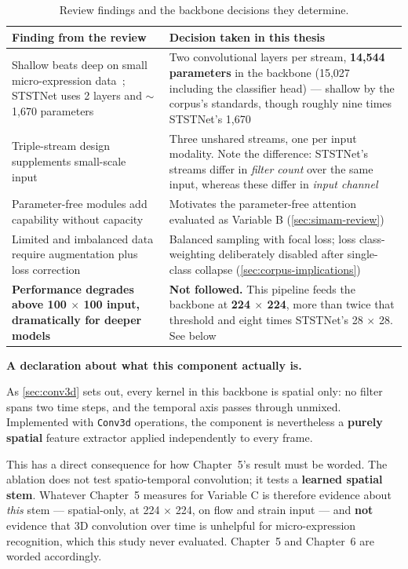 \begin{table}[htbp]
	\centering
	\footnotesize
	\begin{tabular}{p{6.0cm} p{6.5cm}}
		\hline
		\textbf{Finding from the review} & \textbf{Decision taken in this thesis} \\
		\hline
		Shallow beats deep on small micro-expression data~\cite{xia2020b}; STSTNet uses 2 layers and $\sim$1,670 parameters~\cite{liong2019b} & Two convolutional layers per stream, \textbf{14,544 parameters} in the backbone (15,027 including the classifier head) --- shallow by the corpus's standards, though roughly nine times STSTNet's 1,670 \\
		Triple-stream design supplements small-scale input~\cite{liong2019b} & Three unshared streams, one per input modality. Note the difference: STSTNet's streams differ in \textit{filter count} over the same input, whereas these differ in \textit{input channel} \\
		Parameter-free modules add capability without capacity~\cite{xia2020b} & Motivates the parameter-free attention evaluated as Variable B (\autoref{sec:simam-review}) \\
		Limited and imbalanced data require augmentation plus loss correction~\cite{xia2020a} & Balanced sampling with focal loss; loss class-weighting deliberately disabled after single-class collapse (\autoref{sec:corpus-implications}) \\
		\textbf{Performance degrades above 100 $\times$ 100 input, dramatically for deeper models~\cite{xia2020b}} & \textbf{Not followed.} This pipeline feeds the backbone at \textbf{224 $\times$ 224}, more than twice that threshold and eight times STSTNet's 28 $\times$ 28. See below \\
		\hline
	\end{tabular}
	\caption[Review findings and the backbone decisions they determine]{Review findings and the backbone decisions they determine.}
	\label{tab:cnn-decisions}
\end{table}

\textbf{A declaration about what this component actually is.}

As \autoref{sec:conv3d} sets out, every kernel in this backbone is spatial only: no filter spans two time steps, and the temporal axis passes through unmixed. Implemented with \texttt{Conv3d} operations, the component is nevertheless a \textbf{purely spatial} feature extractor applied independently to every frame.

This has a direct consequence for how Chapter~5's result must be worded. The ablation does not test spatio-temporal convolution; it tests a \textbf{learned spatial stem}. Whatever Chapter~5 measures for Variable C is therefore evidence about \textit{this} stem --- spatial-only, at 224 $\times$ 224, on flow and strain input --- and \textbf{not} evidence that 3D convolution over time is unhelpful for micro-expression recognition, which this study never evaluated. Chapter~5 and Chapter~6 are worded accordingly.

